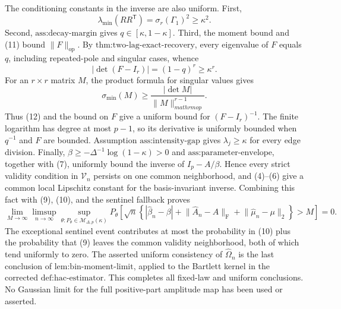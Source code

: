 The conditioning constants in the inverse are also uniform.  First,
\[
 \lambda_{\min}(RR^{\mathsf T})=\sigma_r(\Gamma_1)^2\geq\kappa^2.
\tag{11}
\]
Second, \(\text{ass:decay-margin}\) gives \(q\in[\kappa,1-\kappa]\).  Third, the moment bound and (11) bound \(\lVert F\rVert_{\mathrm{op}}\).  By \(\text{thm:two-lag-exact-recovery}\), every eigenvalue of \(F\) equals \(q\), including repeated-pole and singular cases, whence
\[
 |\det(F-I_r)|=(1-q)^r\geq\kappa^r.
\tag{12}
\]
For an \(r\times r\) matrix \(M\), the product formula for singular values gives
\[
 \sigma_{\min}(M)
 \geq\frac{|\det M|}{\lVert M\rVert_{mathrm{op}}^{r-1}}.
\]
Thus (12) and the bound on \(F\) give a uniform bound for \((F-I_r)^{-1}\).  The finite logarithm has degree at most \(p-1\), so its derivative is uniformly bounded when \(q^{-1}\) and \(F\) are bounded.  Assumption \(\text{ass:intensity-gap}\) gives \(\lambda_j\geq\kappa\) for every edge division.  Finally, \(\beta\geq-\Delta^{-1}\log(1-\kappa)>0\) and \(\text{ass:parameter-envelope}\), together with (7), uniformly bound the inverse of \(I_p-A/\beta\).  Hence every strict validity condition in \(\mathcal V_n\) persists on one common neighborhood, and (4)--(6) give a common local Lipschitz constant for the basis-invariant inverse.  Combining this fact with (9), (10), and the sentinel fallback proves
\[
 \lim_{M\to\infty}\limsup_{n\to\infty}
 \sup_{\theta:P_\theta\in\mathcal M_{\Delta,p}(\kappa)}
 P_\theta\!\left[
 \sqrt n\left\{|\widehat\beta_n-\beta|+
 \lVert\widehat A_n-A\rVert_{\mathrm F}+
 \lVert\widehat\mu_n-\mu\rVert_2\right\}>M\right]=0.
\]
The exceptional sentinel event contributes at most the probability in (10) plus the probability that (9) leaves the common validity neighborhood, both of which tend uniformly to zero.  The asserted uniform consistency of \(\widehat\Omega_n\) is the last conclusion of \(\text{lem:bin-moment-limit}\), applied to the Bartlett kernel in the corrected \(\text{def:hac-estimator}\).  This completes all fixed-law and uniform conclusions.  No Gaussian limit for the full positive-part amplitude map has been used or asserted.